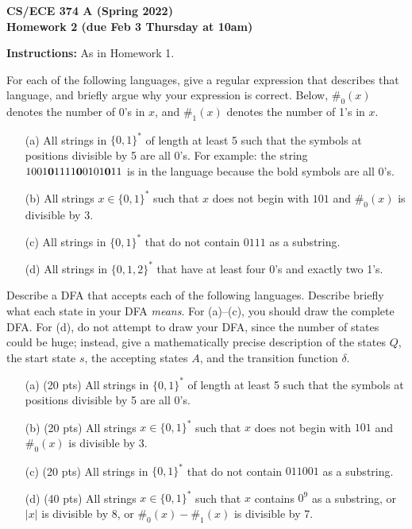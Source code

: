 \documentclass[11pt]{article}
\begin{document}
\begin{center}\Large\bf 
CS/ECE 374 A (Spring 2022)\\
{\Large Homework 2} (due Feb 3 Thursday at 10am)
\end{center}

\medskip\noindent\hrulefill\bigskip

\noindent
{\bf Instructions:} As in Homework 1.

\begin{description}
\medskip
\item[Problem 2.1:]
For each of the
following languages,
give
a regular expression that describes that language, and briefly
argue why your expression is correct.
Below, $\#_0(x)$ denotes the number of 0's in $x$, and $\#_1(x)$ denotes the number of 1's in $x$.

\begin{enumerate}
\item[(a)] All strings in $\{0,1\}^*$ of length at least 5 such that 
the symbols at positions divisible by 5 are all 0's.
For example: 
the string $1001{\bf 0}1111{\bf 0}0101{\bf 0}11$ is in the language because the bold symbols are all 0's.
\item[(b)] All strings $x\in\{0,1\}^*$ such that $x$ does not begin with $101$ and 
$\#_0(x)$ is divisible by 3.
\item[(c)] All strings in $\{0,1\}^*$ that do not contain $0111$ as a substring.
\item[(d)] All strings in $\{0,1,2\}^*$ that have at least four 0's and exactly two 1's.
\end{enumerate}


\bigskip
\item[Problem 2.2:]
Describe a DFA that accepts each of the following languages.
Describe briefly what each state in your DFA \emph{means}.
For (a)--(c), you should draw the complete DFA.
For (d), do not attempt to draw your DFA, since the number of states could be huge; instead,
give a mathematically precise description of the states $Q$, 
the start state $s$, the accepting states $A$, and the transition function $\delta$.



\begin{enumerate}
\item[(a)] (20 pts) All strings in $\{0,1\}^*$ of length at least 5 such that 
the symbols at positions divisible by 5 are all 0's.
\item[(b)] (20 pts) All strings $x\in\{0,1\}^*$ such that $x$ does not begin with $101$ and 
$\#_0(x)$ is divisible by 3.
\item[(c)] (20 pts) All strings in $\{0,1\}^*$ that do not contain $011001$ as a substring.
\item[(d)] (40 pts) All strings $x\in\{0,1\}^*$ such that $x$ contains $0^9$ as a substring, or
$|x|$ is divisible by 8, or $\#_0(x)-\#_1(x)$ is divisible by 7.
\end{enumerate}


\end{description}
\end{document}
